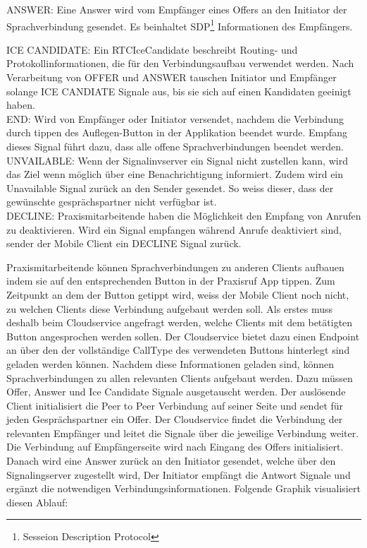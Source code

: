 ANSWER: Eine Answer wird vom Empfänger eines Offers an den Initiator der Sprachverbindung gesendet.
Es beinhaltet SDP\footnote{Sesseion Description Protocol} Informationen des Empfängers.

ICE CANDIDATE: Ein RTCIceCandidate beschreibt Routing- und Protokollinformationen, die für den Verbindungsaufbau verwendet werden.
Nach Verarbeitung von OFFER und ANSWER tauschen Initiator und Empfänger solange ICE CANDIATE Signale aus, bis sie sich auf einen Kandidaten geeinigt haben.\\

END: Wird von Empfänger oder Initiator versendet, nachdem die Verbindung durch tippen des Auflegen-Button in der Applikation beendet wurde.
Empfang dieses Signal führt dazu, dass alle offene Sprachverbindungen beendet werden.\\

UNVAILABLE: Wenn der Signalinvserver ein Signal nicht zustellen kann, wird das Ziel wenn möglich über eine Benachrichtigung informiert.
Zudem wird ein Unavailable Signal zurück an den Sender gesendet.
So weiss dieser, dass der gewünschte gesprächspartner nicht verfügbar ist. \\

DECLINE: Praxismitarbeitende haben die Möglichkeit den Empfang von Anrufen zu deaktivieren.
Wird ein Signal empfangen während Anrufe deaktiviert sind, sender der Mobile Client ein DECLINE Signal zurück. \\

\clearpage

Praxismitarbeitende können Sprachverbindungen zu anderen Clients aufbauen indem sie auf den entsprechenden Button in der Praxisruf App tippen.
Zum Zeitpunkt an dem der Button getippt wird, weiss der Mobile Client noch nicht, zu welchen Clients diese Verbindung aufgebaut werden soll.
Als erstes muss deshalb beim Cloudservice angefragt werden, welche Clients mit dem betätigten Button angesprochen werden sollen.
Der Cloudservice bietet dazu einen Endpoint an über den der vollständige CallType des verwendeten Buttons hinterlegt sind geladen werden können.
Nachdem diese Informationen geladen sind, können Sprachverbindungen zu allen relevanten Clients aufgebaut werden.
Dazu müssen Offer, Answer und Ice Candidate Signale ausgetauscht werden.
Der auslösende Client initialisiert die Peer to Peer Verbindung auf seiner Seite und sendet für jeden Gesprächspartner ein Offer.
Der Cloudservice findet die Verbindung der relevanten Empfänger und leitet die Signale über die jeweilige Verbindung weiter.
Die Verbindung auf Empfängerseite wird nach Eingang des Offers initialisiert.
Danach wird eine Answer zurück an den Initiator gesendet, welche über den Signalingserver zugestellt wird,
Der Initiator empfängt die Antwort Signale und ergänzt die notwendigen Verbindungsinformationen.
Folgende Graphik visualisiert diesen Ablauf:

